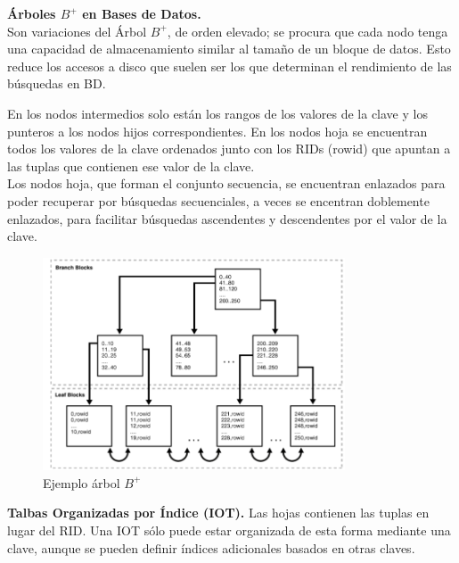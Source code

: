 \documentclass[a4paper,11pt]{article}
\begin{document}
\textbf{Árboles $B^+$ en Bases de Datos.} \\

Son variaciones del Árbol $B^+$, de orden elevado; se procura que cada nodo tenga una capacidad de almacenamiento similar al tamaño de un bloque de datos. Esto reduce los accesos a disco que suelen ser los que determinan el rendimiento de las búsquedas en BD. 

En los nodos intermedios solo están los rangos de los valores de la clave y los punteros a los nodos hijos correspondientes. En los nodos hoja se encuentran todos los valores de la clave ordenados junto con los RIDs (rowid) que apuntan a las tuplas que contienen ese valor de la clave. \\

Los nodos hoja, que forman el conjunto secuencia, se encuentran enlazados para poder recuperar por búsquedas secuenciales, a veces se encentran doblemente enlazados, para facilitar búsquedas ascendentes y descendentes por el valor de la clave. \\

\begin{figure}[h]
\centering
\caption{Ejemplo árbol $B^+$}
\includegraphics[scale=1,width=0.8\textwidth]{ejemplo_arbol_b+.png}
\end{figure}

\textbf{Talbas Organizadas por Índice (IOT).} Las hojas contienen las tuplas en lugar del RID. Una IOT sólo puede estar organizada de esta forma mediante una clave, aunque se pueden definir índices adicionales basados en otras claves. \\
\end{document}
